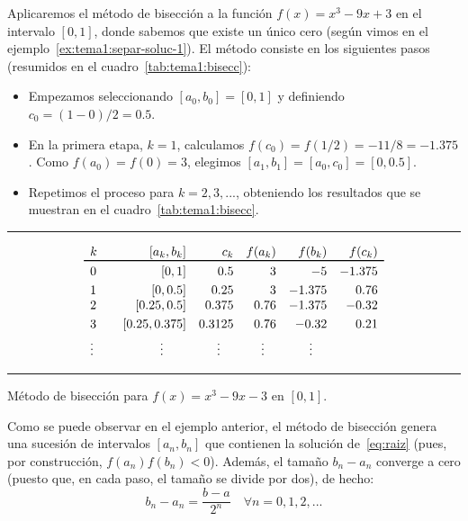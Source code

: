 \begin{example}
  Aplicaremos el método de bisección a la función $f(x)=x^3-9x+3$ en el intervalo
  $[0,1]$, donde sabemos que existe un único cero (según vimos en el
  ejemplo~\ref{ex:tema1:separ-soluc-1}). El método consiste en los
  siguientes pasos (resumidos en el cuadro~\ref{tab:tema1:bisecc}):

  \begin{itemize}
  \item Empezamos seleccionando $[a_0,b_0]=[0,1]$ y definiendo
    $c_0=(1-0)/2=0.5$.
  \item En la primera etapa, $k=1$, calculamos
    $f(c_0)=f(1/2)=-11/8=-1.375$. Como $f(a_0)=f(0)=3$, elegimos
    $[a_1,b_1]=[a_0,c_0]=[0,0.5]$.
  \item Repetimos el proceso para $k=2,3,...$, obteniendo los resultados que se
    muestran en el cuadro~\ref{tab:tema1:bisecc}.
  \end{itemize}

\end{example}
\begin{table}
  \centering
  \rule{0.99\linewidth}{1.6pt}
  \begin{equation*}
    \begin{array}{l<{\quad}rrrrr}%
     k &  [a_k,b_k] & c_k & f(a_k) & f(b_k) & f(c_k) 
      \\ \toprule%
     0 & [0,1]  &  0.5 
      & 3 & -5 & -1.375
      \\ \noalign{\smallskip}
     1 &  [0,0.5] &  0.25
      & 3 & -1.375 & 0.76
      \\ \smallskip
     2 & [0.25,0.5] & 0.375
      & 0.76 & -1.375 & -0.32
     \\ \smallskip
     3& [0.25,0.375] & 0.3125
      & 0.76 & -0.32 & 0.21
      \\
      \hfill \vdots \hfill~ & \hfill \vdots \hfill~ & 
      \hfill \vdots \hfill~ & \hfill \vdots \hfill~ & \hfill \vdots \hfill~
    \end{array}
  \end{equation*}
  \rule{0.99\linewidth}{1.5pt}
  \caption{Método de bisección para $f(x)=x^3-9x-3$ en $[0,1]$.}
  \label{tab:tema1:bisecc}
\end{table}

Como se puede observar en el ejemplo anterior, el método de bisección
genera una sucesión de intervalos $[a_n,b_n]$ que
contienen la solución de~\eqref{eq:raiz} (pues, por construcción,
$f(a_n)f(b_n)<0$). Además, el tamaño $b_n-a_n$ converge a cero (puesto
que, en cada paso, el tamaño se divide por dos), de hecho:
\begin{equation}
  \label{eq:tema1:bisec:1}
  b_n-a_n = \frac{b-a}{2^n} \quad \forall n=0,1,2,...
\end{equation}

